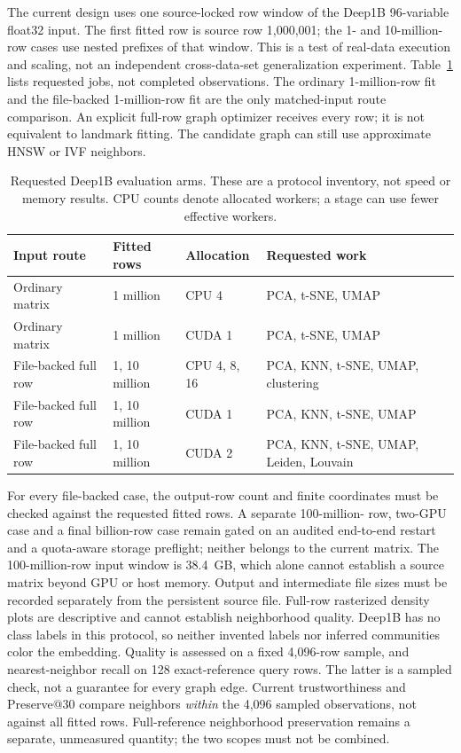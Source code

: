 \documentclass[article]{jss}
\begin{document}
The current design uses one source-locked row window of the Deep1B
96-variable float32 input. The first fitted row is source row 1,000,001;
the 1- and 10-million-row cases use nested prefixes of that window.
This is a test of real-data execution and scaling, not an independent
cross-data-set generalization experiment. Table~\ref{tab:file-backed-design}
lists requested jobs, not completed observations. The ordinary 1-million-row
fit and the file-backed 1-million-row fit are the only matched-input route
comparison. An explicit full-row graph optimizer receives every row; it is
not equivalent to landmark fitting. The candidate graph can still use
approximate HNSW or IVF neighbors.

\begin{table}[htbp]
\centering
\scriptsize
\caption{Requested Deep1B evaluation arms. These are a protocol inventory,
  not speed or memory results. CPU counts denote allocated workers; a stage
  can use fewer effective workers.}
\label{tab:file-backed-design}
\begin{tabular}{llll}
\toprule
Input route & Fitted rows & Allocation & Requested work \\
\midrule
Ordinary matrix & 1 million & CPU 4 & PCA, t-SNE, UMAP \\
Ordinary matrix & 1 million & CUDA 1 & PCA, t-SNE, UMAP \\
File-backed full row & 1, 10 million & CPU 4, 8, 16 &
  PCA, KNN, t-SNE, UMAP, clustering \\
File-backed full row & 1, 10 million & CUDA 1 &
  PCA, KNN, t-SNE, UMAP \\
File-backed full row & 1, 10 million & CUDA 2 &
  PCA, KNN, t-SNE, UMAP, Leiden, Louvain \\
\bottomrule
\end{tabular}
\end{table}

For every file-backed case, the output-row count and finite coordinates
must be checked against the requested fitted rows. A separate 100-million-
row, two-GPU case and a final billion-row case remain gated on an audited
end-to-end restart and a quota-aware storage preflight; neither belongs to
the current matrix. The 100-million-row input window is 38.4~GB, which
alone cannot establish a source matrix beyond GPU or host memory. Output
and intermediate file sizes must be recorded separately from the
persistent source file. Full-row rasterized density plots are descriptive
and cannot establish neighborhood quality. Deep1B has no class labels in
this protocol, so neither invented labels nor inferred communities color
the embedding. Quality is assessed on a fixed 4,096-row sample, and
nearest-neighbor recall on 128 exact-reference query rows. The latter is
a sampled check, not a guarantee for every graph edge.
Current trustworthiness and Preserve@30 compare neighbors \emph{within}
the 4,096 sampled observations, not against all fitted rows.
Full-reference neighborhood preservation remains a separate,
unmeasured quantity; the two scopes must not be combined.
\end{document}
